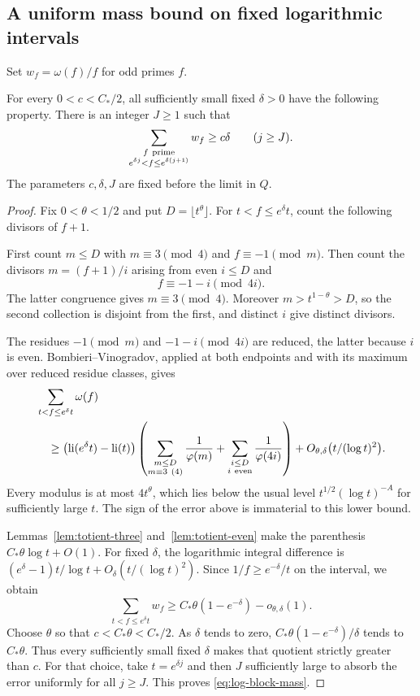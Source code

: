 \subsection{A uniform mass bound on fixed logarithmic intervals}
Set $w_f=\omega(f)/f$ for odd primes $f$.
\begin{lemma}\label{lem:short-block-mass}
For every $0<c<C_*/2$, all sufficiently small fixed $\delta>0$
have the following property. There is an integer $J\ge1$ such that
\begin{equation}\label{eq:log-block-mass}
 \sum_{\substack{f\ {\rm prime}\\
          e^{\delta j}<f\le e^{\delta(j+1)}}}w_f\ge c\delta
 \qquad(j\ge J).
\end{equation}
The parameters $c,\delta,J$ are fixed before the limit in $Q$.
\end{lemma}
\begin{proof}
Fix $0<\theta<1/2$ and put $D=\lfloor t^\theta\rfloor$.
For $t<f\le e^\delta t$, count the following divisors of $f+1$.

First count $m\le D$ with $m\equiv3\pmod4$ and
$f\equiv-1\pmod m$. Then count the divisors $m=(f+1)/i$
arising from even $i\le D$ and
\[
 f\equiv-1-i\pmod{4i}.
\]
The latter congruence gives $m\equiv3\pmod4$.
Moreover $m>t^{1-\theta}>D$, so the second collection is
disjoint from the first, and distinct $i$ give distinct divisors.

The residues $-1\pmod m$ and $-1-i\pmod{4i}$ are reduced,
the latter because $i$ is even.
Bombieri--Vinogradov, applied at both endpoints and with its
maximum over reduced residue classes, gives
\begin{align*}
 &\sum_{t<f\le e^\delta t}\omega(f)\\
 &\quad\ge
  \bigl(\operatorname{li}(e^\delta t)-\operatorname{li}(t)\bigr)
  \left(
     \sum_{\substack{m\le D\\m\equiv3\ (4)}}\frac1{\varphi(m)}
     +\sum_{\substack{i\le D\\i\ {\rm even}}}
                                    \frac1{\varphi(4i)}
  \right)
  +O_{\theta,\delta}\bigl(t/(\log t)^2\bigr).
\end{align*}
Every modulus is at most $4t^\theta$, which lies below the usual
level $t^{1/2}(\log t)^{-A}$ for sufficiently large $t$.
The sign of the error above is immaterial to this lower bound.

Lemmas~\ref{lem:totient-three} and~\ref{lem:totient-even}
make the parenthesis $C_*\theta\log t+O(1)$.
For fixed $\delta$, the logarithmic integral difference is
$(e^\delta-1)t/\log t+O_\delta(t/(\log t)^2)$.
Since $1/f\ge e^{-\delta}/t$ on the interval, we obtain
\begin{equation}\label{eq:short-block-prelimit}
 \sum_{t<f\le e^\delta t}w_f
 \ge C_*\theta(1-e^{-\delta})-o_{\theta,\delta}(1).
\end{equation}
Choose $\theta$ so that $c<C_*\theta<C_*/2$.
As $\delta$ tends to zero,
$C_*\theta(1-e^{-\delta})/\delta$ tends to $C_*\theta$.
Thus every sufficiently small fixed $\delta$ makes that quotient
strictly greater than $c$. For that choice, take $t=e^{\delta j}$
and then $J$ sufficiently large to absorb the error uniformly for
all $j\ge J$. This proves \eqref{eq:log-block-mass}.
\end{proof}

